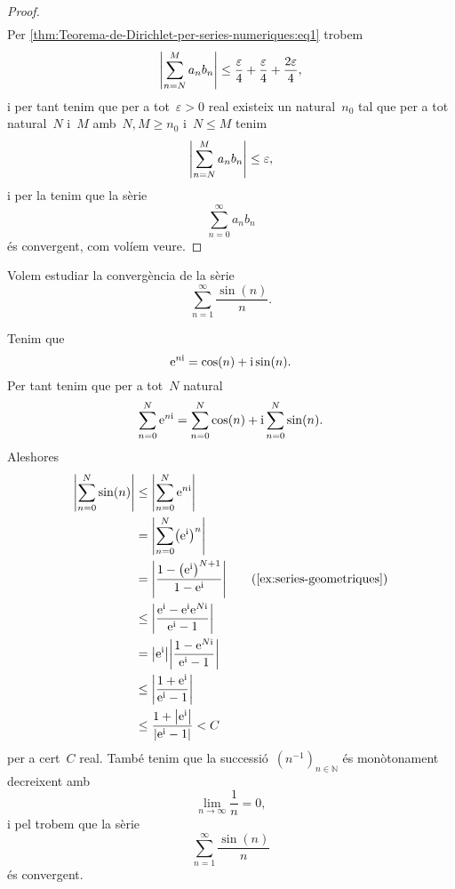 \documentclass[../analisi-matematica.tex]{subfiles}
\begin{document}
\begin{proof}
\begin{align*}
        \end{align*}
        Per \eqref{thm:Teorema-de-Dirichlet-per-series-numeriques:eq1} trobem
        \[
            \abs{\sum_{n=N}^{M}a_{n}b_{n}}\leq\frac{\varepsilon}{4}+\frac{\varepsilon}{4}+\frac{2\varepsilon}{4},
        \]
        i per tant tenim que per a tot~\(\varepsilon>0\) real existeix un natural~\(n_{0}\) tal que per a tot natural~\(N\) i~\(M\) amb~\(N,M\geq n_{0}\) i~\(N\leq M\) tenim
        \[
            \abs{\sum_{n=N}^{M}a_{n}b_{n}}\leq\varepsilon,
        \]
        i per la  tenim que la sèrie
        \[
            \sum_{n=0}^{\infty}a_{n}b_{n}
        \]
        és convergent, com volíem veure.
    \end{proof}
    \begin{example}%
        \label{ex:Teorema-de-Dirichlet-per-series-numeriques}
        Volem estudiar la convergència de la sèrie
        \[
            \sum_{n=1}^{\infty}\frac{\sin(n)}{n}.
        \]
    \end{example}
    \begin{solution} %
        Tenim que
        \[
            \mathrm{e}^{n\mathrm{i}}=\cos(n)+\mathrm{i}\sin(n).
        \]
        Per tant tenim que per a tot~\(N\) natural
        \[
            \sum_{n=0}^{N}\mathrm{e}^{n\mathrm{i}}=\sum_{n=0}^{N}\cos(n)+\mathrm{i}\sum_{n=0}^{N}\sin(n).
        \]
        Aleshores
        \begin{align*}
            \abs{\sum_{n=0}^{N}\sin(n)}&\leq\abs{\sum_{n=0}^{N}\e^{n\iu}} \\
            &=\abs{\sum_{n=0}^{N}\left(\e^{\iu}\right)^{n}} \\
            &=\abs{\frac{1-\left(\e^{\iu}\right)^{N+1}}{1-\e^{\iu}}} \tag{\ref{ex:series-geometriques}}\\
            &\leq\abs{\frac{\e^{\iu}-\e^{\iu}\e^{N\iu}}{\e^{\iu}-1}} \\
            &=\abs{\e^{\iu}}\abs{\frac{1-\e^{N\iu}}{\e^{\iu}-1}} \\
            &\leq\abs{\frac{1+\e^{\iu}}{\e^{\iu}-1}} \\
            &\leq\frac{1+\abs{\e^{\iu}}}{\abs{\e^{\iu}-1}}<C \\
        \end{align*}
        per a cert~\(C\) real.
        També tenim que la successió~\((n^{-1})_{n\in\mathbb{N}}\) és monòtonament decreixent amb
        \[
            \lim_{n\to\infty}\frac{1}{n}=0,
        \]
        i pel  trobem que la sèrie
        \[
            \sum_{n=1}^{\infty}\frac{\sin(n)}{n}
        \]
        és convergent.
    \end{solution} %
\end{document}
